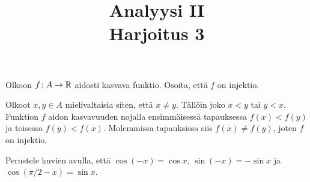 \documentclass[11pt,a4paper]{amsart}
\title{Analyysi II\\Harjoitus 3}
\author{}
\date{}
\begin{document}

\begin{exercise}
  Olkoon \(f \colon A \to \mathbb{R}\) aidosti kasvava funktio. Osoita, että \(f\)
  on injektio.
\end{exercise}

\begin{solution}
  Olkoot \(x, y \in A\) mielivaltaisia siten, että \(x \neq y\).
  Tällöin joko \(x < y\) tai \(y < x\). Funktion \(f\) aidon kasvavuuden
  nojalla ensimmäisessä tapauksessa \(f(x) < f(y)\) ja toisessa
  \(f(y) < f(x)\). Molemmissa tapauksissa siis \(f(x) \neq f(y)\),
  joten \(f\) on injektio.
\end{solution}

\begin{exercise}
  Perustele kuvien avulla, että \(\cos(-x) = \cos x\),
  \(\sin(-x) = -\sin x\) ja \(\cos(\pi/2 - x) = \sin x\).
\end{exercise}
\end{document}
